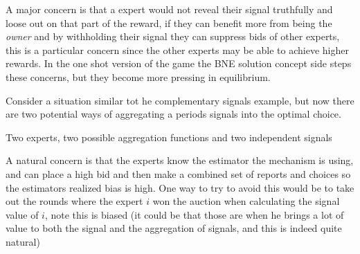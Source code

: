  A major concern is that a expert would not reveal their signal truthfully and loose out on that part of the reward, if they can benefit more from being the \emph{owner} and by withholding their signal they can suppress bids of other experts, this is a particular concern since the other experts may be able to achieve higher rewards.
In the one shot version of the game the BNE solution concept side steps these concerns, but they become more pressing in equilibrium. 

Consider a situation similar tot he complementary signals example, but now there are two potential ways of aggregating a periods signals into the optimal choice. %

Two experts, two possible aggregation functions and two independent signals



A natural concern is that the experts know the estimator the mechanism is using, and can place a high bid and then make a combined set of reports and choices so the estimators realized bias is high.
One way to try to avoid this would be to take out the rounds where the expert $i$ won the auction when calculating the signal value of $i$, note this is biased (it could be that those are when he brings a lot of value to both the signal and the aggregation of signals, and this is indeed quite natural)







